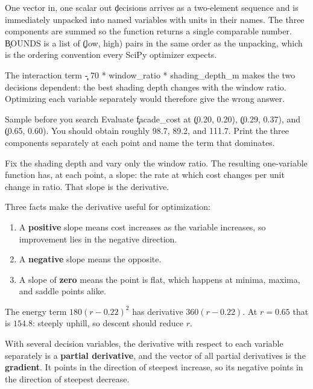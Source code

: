 \begin{SyntaxBox}{One vector in, one scalar out}
\c{decisions} arrives as a two-element sequence and is immediately unpacked into
named variables with units in their names. The three components are summed so
the function returns a single comparable number. \c{BOUNDS} is a list of
\c{(low, high)} pairs in the same order as the unpacking, which is the ordering
convention every SciPy optimizer expects.
\end{SyntaxBox}

The interaction term \c{- 70 * window_ratio * shading_depth_m} makes the two
decisions dependent: the best shading depth changes with the window ratio.
Optimizing each variable separately would therefore give the wrong answer.

\begin{TryBox}{Sample before you search}
Evaluate \c{facade_cost} at \c{(0.20, 0.20)}, \c{(0.29, 0.37)}, and
\c{(0.65, 0.60)}. You should obtain roughly 98.7, 89.2, and 111.7. Print the
three components separately at each point and name the term that dominates.
\end{TryBox}


Fix the shading depth and vary only the window ratio. The resulting
one-variable function has, at each point, a slope: the rate at which cost
changes per unit change in ratio. That slope is the derivative.

Three facts make the derivative useful for optimization:

\begin{enumerate}
    \item A \textbf{positive} slope means cost increases as the variable
          increases, so improvement lies in the negative direction.
    \item A \textbf{negative} slope means the opposite.
    \item A slope of \textbf{zero} means the point is flat, which happens at
          minima, maxima, and saddle points alike.
\end{enumerate}

The energy term $180(r - 0.22)^2$ has derivative $360(r - 0.22)$. At $r = 0.65$
that is $154.8$: steeply uphill, so descent should reduce $r$.


With several decision variables, the derivative with respect to each variable
separately is a \textbf{partial derivative}, and the vector of all partial
derivatives is the \textbf{gradient}. It points in the direction of steepest
increase, so its negative points in the direction of steepest decrease.

